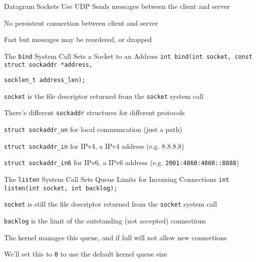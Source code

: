   \begin{frame}{Datagram Sockets Use UDP}
    Sends messages between the client and server

    \vspace{2em}

    No persistent connection between client and server

    \vspace{2em}

    Fast but messages may be reordered, or dropped
  \end{frame}

  \begin{frame}{The \texttt{bind} System Call Sets a Socket to an Address}
    \lstinline|int bind(int socket, const struct sockaddr *address,|

    \hspace{4.4em} \lstinline|socklen_t address_len);|

    \vspace{2em}

    \texttt{socket} is the file descriptor returned from the \texttt{socket}
    system call

    \vspace{2em}

    There's different \lstinline|sockaddr| structures for different protocols

    \hspace{2em} \lstinline|struct sockaddr_un| for local communcation (just a path)

    \hspace{2em} \lstinline|struct sockaddr_in| for IPv4, a IPv4 address
                 (e.g. 8.8.8.8)

    \hspace{2em} \lstinline|struct sockaddr_in6| for IPv6, a IPv6 address
                 (e.g. \lstinline|2001:4860:4860::8888|)
  \end{frame}

  \begin{frame}{The \texttt{listen} System Call Sets Queue Limits for Incoming
                Connections}
    \lstinline|int listen(int socket, int backlog);|

    \vspace{2em}

    \texttt{socket} is still the file descriptor returned from the
    \texttt{socket} system call
    
    \vspace{2em}

    \texttt{backlog} is the limit of the outstanding (not accepted) connections

    \hspace{2em} The kernel manages this queue, and if full will not allow new connections

    \vspace{2em}

    We'll set this to \lstinline|0| to use the default kernel queue size
  \end{frame}


